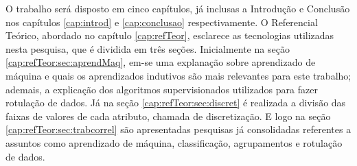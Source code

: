  



O trabalho será disposto em cinco capítulos, já inclusas a Introdução e Conclusão nos capítulos \ref{cap:introd} e \ref{cap:conclusao} respectivamente. O Referencial Teórico, abordado no capítulo \ref{cap:refTeor}, esclarece as tecnologias utilizadas nesta pesquisa, que é dividida em três seções. Inicialmente na seção \ref{cap:refTeor:sec:aprendMaq}, em-se uma explanação sobre aprendizado de máquina e quais os aprendizados indutivos são mais relevantes para este trabalho; ademais, a explicação dos algoritmos supervisionados utilizados para fazer rotulação de dados. Já na seção \ref{cap:refTeor:sec:discret} é realizada a divisão das faixas de valores de cada atributo, chamada de discretização. E logo na seção \ref{cap:refTeor:sec:trabcorrel} são apresentadas pesquisas já consolidadas referentes a assuntos como aprendizado de máquina, classificação, agrupamentos e rotulação de dados. 

